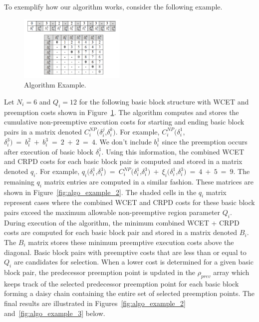 To exemplify how our algorithm works, consider the following example.
\begin{figure}[h!]
\vspace{-5pt}
\begin{center}
\includegraphics[width=0.45\textwidth]{algo_example.png}
\caption{Algorithm Example.}
\label{fig:algo_example}
\end{center}
\vspace{-10pt}
\end{figure}
Let $N_i=6$ and $Q_i=12$ for the following basic block structure with WCET and preemption costs shown in Figure~\ref{fig:algo_example}.  The algorithm computes and stores the cumulative non-preemptive execution costs for starting and ending basic block pairs in a matrix denoted $C_{i}^{NP}(\delta_{i}^{j}$,$\delta_{i}^{k})$. For example, $C_{i}^{NP}(\delta_{i}^{1}$,$\delta_{i}^{3})\ =\ b_{i}^{2}\ +\ b_{i}^{3}\ =\ 2\ +\ 2\ =\ 4$.  We don't include $b_{i}^{1}$ since the preemption occurs after execution of basic block $\delta_{i}^{1}$.  Using this information, the combined WCET and CRPD costs for each basic block pair is computed and stored in a matrix denoted $q_{i}$. For example, $q_{i}(\delta_{i}^{1}$,$\delta_{i}^{3})\ =\ C_{i}^{NP}(\delta_{i}^{1}$,$\delta_{i}^{3})\ +\ \xi_{i}(\delta_{i}^{1}$,$\delta_{i}^{3})\ =\ 4\ +\ 5\ =\ 9$.  The remaining $q_{i}$ matrix entries are computed in a similar fashion.  These matrices are shown in Figure~\ref{fig:algo_example_2}.  The shaded cells in the $q_{i}$ matrix represent cases where the combined WCET and CRPD costs for these basic block pairs exceed the maximum allowable non-preemptive region parameter $Q_i$.  During execution of the algorithm, the minimum combined WCET + CRPD costs are computed for each basic block pair and stored in a matrix denoted $B_{i}$.  The $B_{i}$ matrix stores these minimum preemptive execution costs above the diagonal.  Basic block pairs with preemptive costs that are less than or equal to $Q_i$ are candidates for selection.  When a lower cost is determined for a given basic block pair, the predecessor preemption point is updated in the $\rho_{prev}$ array which keeps track of the selected predecessor preemption point for each basic block forming a daisy chain containing the entire set of selected preemption points.  The final results are illustrated in Figures~\ref{fig:algo_example_2} and~\ref{fig:algo_example_3} below.
